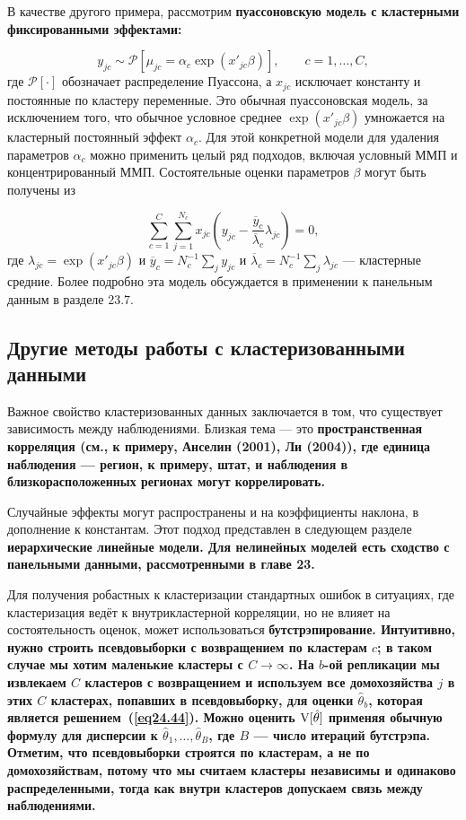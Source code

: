 В качестве другого примера, рассмотрим \bfseries пуассоновскую модель с кластерными фиксированными эффектами: \mdseries

$$
y_{jc} \sim \mathcal P [\mu_{jc} = \alpha_c \exp(x'_{jc} \beta)], \qquad c=1, \dots, C, 
$$
где $\mathcal P[\cdot]$ обозначает распределение Пуассона, а $x_{jc}$ исключает константу и постоянные по кластеру переменные. Это обычная пуассоновская модель, за исключением того, что обычное условное среднее $\exp(x'_{jc} \beta)$ умножается на кластерный постоянный эффект $\alpha_c$. Для этой конкретной модели для удаления параметров $\alpha_c$ можно применить целый ряд подходов, включая условный ММП и концентрированный ММП. Состоятельные оценки параметров $\beta$ могут быть получены из 

$$
\sum_{c=1}^C \sum_{j=1}^{N_c} x_{jc} \left( y_{jc} - \frac{\overline{y}_c}{\overline{\lambda}_c} \lambda_{jc} \right) =0,
$$
где $\lambda_{jc} = \exp(x'_{jc}\beta)$ и $\overline{y}_c = N_c^{-1} \sum_j y_{jc}$ и $\overline{\lambda}_c = N_c^{-1} \sum_j \lambda_{jc}$ --- кластерные средние. Более подробно эта модель обсуждается в применении к панельным данным в разделе 23.7. 

\subsection{Другие методы работы с кластеризованными данными}

Важное свойство кластеризованных данных заключается в том, что существует зависимость между наблюдениями. Близкая тема --- это \bfseries пространственная корреляция \mdseries (см., к примеру, Анселин (2001), Ли (2004)), где единица наблюдения --- регион, к примеру, штат, и наблюдения в близкорасположенных регионах могут коррелировать. 

Случайные эффекты могут распространены и на коэффициенты наклона, в дополнение к константам. Этот подход представлен в следующем разделе \bfseries иерархические линейные модели\mdseries. Для нелинейных моделей есть сходство с панельными данными, рассмотренными в главе 23. 

Для получения робастных к кластеризации стандартных ошибок в ситуациях, где кластеризация ведёт к внутрикластерной корреляции, но не влияет на состоятельность оценок, может использоваться \bfseries бутстрэпирование. \mdseries Интуитивно, нужно строить псевдовыборки с возвращением по кластерам $c$; в таком случае мы хотим маленькие кластеры с $C \to \infty$. На $b$-ой репликации мы извлекаем $C$ кластеров с возвращением и используем все домохозяйства $j$ в этих $C$ кластерах, попавших в псевдовыборку, для оценки $\hat \theta_b$, которая является решением~(\ref{eq24.44}). Можно оценить $\mathrm{V}[\hat \theta]$ применяя обычную формулу для дисперсии к $\hat \theta_1, \dots, \hat \theta_B$, где $B$ --- число итераций бутстрэпа. Отметим, что псевдовыборки строятся по кластерам, а не по домохозяйствам, потому что мы считаем кластеры независимы и одинаково распределенными, тогда как внутри кластеров допускаем связь между наблюдениями. 

